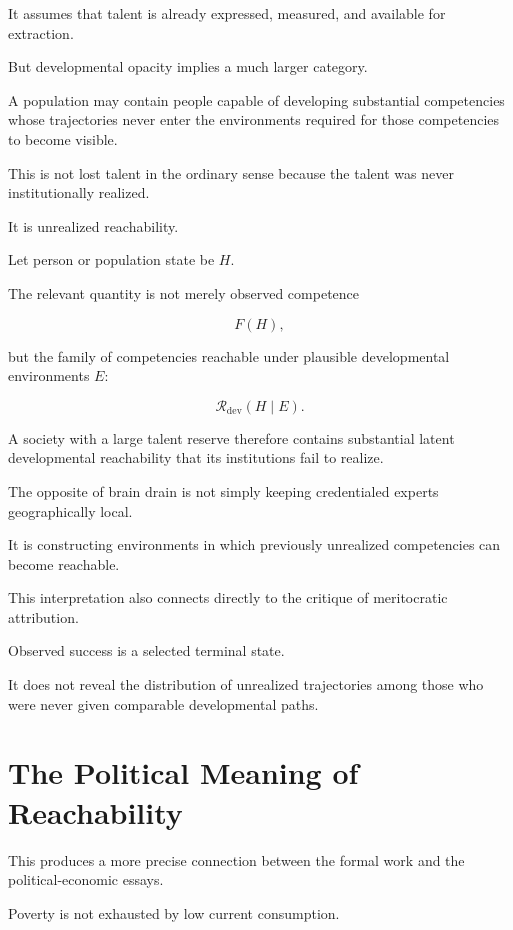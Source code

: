 \documentclass[11pt]{article}
\theoremstyle{remark}
\newcommand{\Reach}{\mathcal{R}}
\begin{document}
It assumes that talent is already expressed, measured, and available for extraction.

But developmental opacity implies a much larger category.

A population may contain people capable of developing substantial competencies whose trajectories never enter the environments required for those competencies to become visible.

This is not lost talent in the ordinary sense because the talent was never institutionally realized.

It is unrealized reachability.

Let person or population state be $H$.

The relevant quantity is not merely observed competence

\begin{equation}
F(H),
\end{equation}

but the family of competencies reachable under plausible developmental environments $E$:

\begin{equation}
\Reach_{\mathrm{dev}}(H\mid E).
\end{equation}

A society with a large talent reserve therefore contains substantial latent developmental reachability that its institutions fail to realize.

The opposite of brain drain is not simply keeping credentialed experts geographically local.

It is constructing environments in which previously unrealized competencies can become reachable.

This interpretation also connects directly to the critique of meritocratic attribution.

Observed success is a selected terminal state.

It does not reveal the distribution of unrealized trajectories among those who were never given comparable developmental paths.

\section{The Political Meaning of Reachability}

This produces a more precise connection between the formal work and the political-economic essays.

Poverty is not exhausted by low current consumption.
\end{document}
